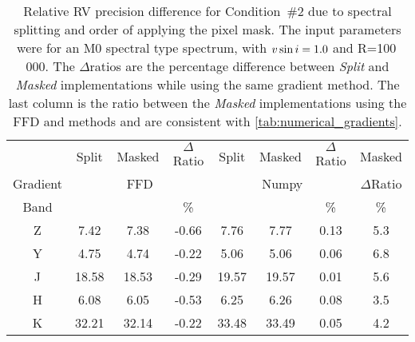
\begin{table}
    \centering
    \caption[{RV} precision with different splitting.]{Relative {RV} precision difference for Condition~\#2 due to spectral splitting and order of applying the pixel mask.
        The input parameters were for an M0 spectral type spectrum, with $v\sin{i}=1.0$ and R=100\,000.
        The \(\Delta\)ratios are the percentage difference between \textit{Split} and \textit{Masked} implementations while using the same gradient method.
        The last column is the ratio between the \textit{Masked} implementations using the {FFD} and \npgradient{} methods and are consistent with \cref{tab:numerical_gradients}.
        }
    \begin{tabular}{c|ccc|ccc|c}
        \toprule
        & Split & Masked & \(\Delta\)Ratio & Split & Masked & \(\Delta\)Ratio & Masked \\
        Gradient & \multicolumn{3}{c|}{FFD} & \multicolumn{3}{c|}{Numpy} & \(\Delta\)Ratio\\
        Band & \mps{} & \mps{} &  \%  & \mps{} & \mps{} &   \% & \% \\
        \midrule
        Z &  7.42 &  7.38 & -0.66 &  7.76 &  7.77 & 0.13 & 5.3\\
        Y &  4.75 &  4.74 & -0.22 &  5.06 &  5.06 & 0.06 & 6.8\\
        J & 18.58 & 18.53 & -0.29 & 19.57 & 19.57 & 0.01 & 5.6\\
        H &  6.08 &  6.05 & -0.53 &  6.25 &  6.26 & 0.08 & 3.5\\
        K & 32.21 & 32.14 & -0.22 & 33.48 & 33.49 & 0.05 & 4.2\\
        \bottomrule
    \end{tabular}\label{tab:mask_ordering}
\end{table}
